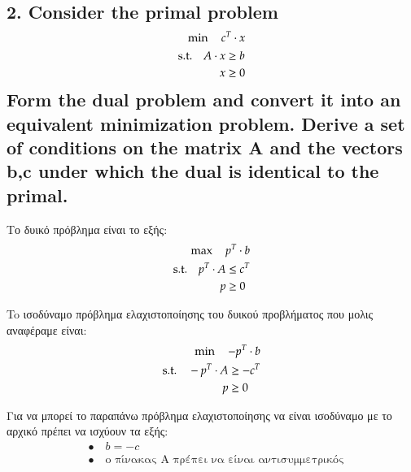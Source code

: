 \documentclass[12pt]{article}
\begin{document}
\vspace{2in}

\pagebreak

\subsection*{2. Consider the primal problem
	\begin{align*}
		\min \quad c^{T} \cdot x \\
		\begin{aligned}
			\textup{s.t.}\quad
			A \cdot x & \geq b \\
			x & \geq 0 
		\end{aligned}
	\end{align*}
	Form the dual problem and convert it into an equivalent minimization problem. Derive a set of
	conditions on the matrix A and the vectors b,c under which the dual is identical to the primal.}

Το δυικό πρόβλημα είναι το εξής: \\

\begin{align*}
	\max \quad p^{T} \cdot b \\
	\begin{aligned}
		\textup{s.t.}\quad	
		p^{T} \cdot A & \leq c^{T} \\
		p & \geq 0 
	\end{aligned}
\end{align*}

To ισοδύναμο πρόβλημα ελαχιστοποίησης του δυικού προβλήματος που μολις αναφέραμε είναι: \\

\begin{align*}
	\min \quad -p^{T} \cdot b \\
	\begin{aligned}
		\textup{s.t.}\quad
		-p^{T} \cdot A & \geq -c^{T} \\
		p & \geq 0 
	\end{aligned}
\end{align*}

Για να μπορεί το παραπάνω πρόβλημα ελαχιστοποίησης να είναι ισοδύναμο με το αρχικό πρέπει να ισχύουν τα εξής: \\

\begin{align*}
	&\bullet \quad b = -c \\
	&\bullet \quad \text{ο πίνακας A πρέπει να είναι αντισυμμετρικός} 
\end{align*}
\end{document}
